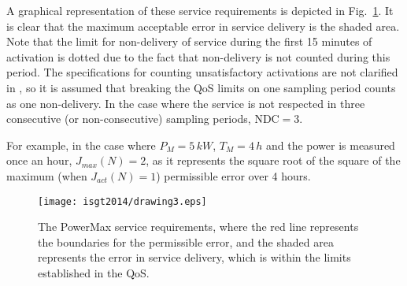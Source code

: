 A graphical representation of these service requirements is depicted in Fig.~\ref{fig:servicereq}. It is clear that the maximum acceptable error in service delivery is the shaded area. Note that the limit for non-delivery of service during the first 15 minutes of activation is dotted due to the fact that non-delivery is not counted during this period. The specifications for counting unsatisfactory activations are not clarified in \cite{ipower2013development}, so it is assumed that breaking the QoS limits on one sampling period counts as one non-delivery. In the case where the service is not respected in three consecutive (or non-consecutive) sampling periods, $\text{NDC}=3$.

For example, in the case where  $P_M = 5\,kW$, $T_M=4\, h$ and the power is measured once an hour, $J_{max}(N) = 2$, as it represents the square root of the square of the maximum (when $J_{act}(N)=1$) permissible error over 4 hours.
\begin{figure}[t]  %
	\centering
	\texttt{[image: isgt2014/drawing3.eps]}
	\caption{The PowerMax service requirements, where the red line represents the boundaries for the permissible error, and the shaded area represents the error in service delivery, which is within the limits established in the QoS. }\label{fig:servicereq}
\end{figure}

	
